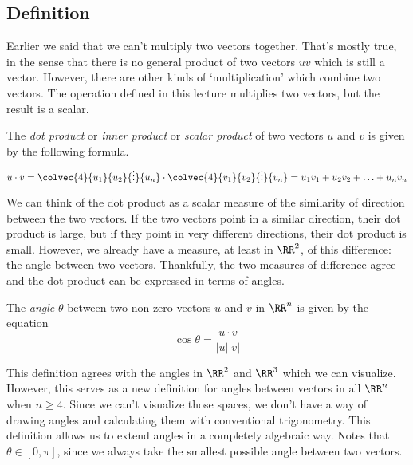 \documentclass[fleqn]{report}
\begin{document}
\subsection{Definition}
\label{dot-product-definition}

Earlier we said that we can't multiply two vectors together.
That's mostly true, in the sense that there is no general
product of two vectors $uv$ which is still a vector.
However, there are other kinds of `multiplication' which
combine two vectors. The operation defined in this lecture
multiplies two vectors, but the result is a scalar.

\begin{defn}
The \emph{dot product} or \emph{inner product} or \emph{scalar
product} of two vectors $u$ and $v$ is given by the following formula.
\begin{equation*}
u \cdot v = \colvec{4}{u_1}{u_2}{\vdots}{u_n} \cdot
\colvec{4}{v_1}{v_2}{\vdots}{v_n} = u_1 v_1 + u_2 v_2 + \ldots
+ u_n v_n
\end{equation*}
\end{defn}

We can think of the dot product as a scalar measure of the
similarity of direction between the two vectors. If the two
vectors point in a similar direction, their dot product is
large, but if they point in very different directions, their
dot product is small. However, we already have a measure, at
least in $\RR^2$, of this difference: the angle between two
vectors. Thankfully, the two measures of difference agree and
the dot product can be expressed in terms of angles.

\begin{defn}
The \emph{angle} $\theta$ between two non-zero vectors $u$ and
$v$ in $\RR^n$ is given by the equation
\begin{equation*}
\cos \theta = \frac{u \cdot v}{|u||v|}
\end{equation*}
\end{defn}

This definition agrees with the angles in $\RR^2$ and
$\RR^3$ which we can visualize. However, this serves as a
new definition for angles between vectors in all $\RR^n$ when $n
\geq 4$. Since we can't visualize those spaces, we don't have
a way of drawing angles and calculating them with conventional
trigonometry. This definition allows us to extend angles in a
completely algebraic way. Notes that $\theta \in [0, \pi]$,
since we always take the smallest possible angle between two
vectors.
\end{document}
